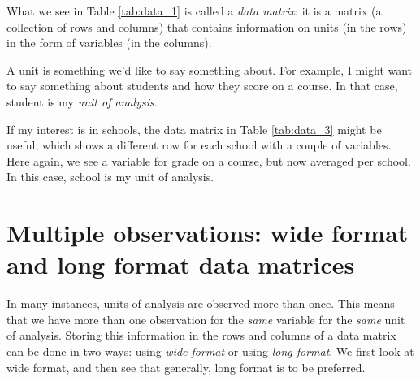What we see in Table \ref{tab:data_1} is called a \textit{data matrix}: it is a matrix (a collection of rows and columns) that contains information on units (in the rows) in the form of variables (in the columns).

A unit is something we'd like to say something about. For example, I might want to say something about students and how they score on a course. In that case, student is my \textit{unit of analysis}. 

% 

If my interest is in schools, the data matrix in Table \ref{tab:data_3} might be useful, which shows a different row for each school with a couple of variables. Here again, we see a variable for grade on a course, but now averaged per school. In this case, school is my unit of analysis. 

\begin{kframe}


{\ttfamily\noindent\bfseries{}}

{\ttfamily\noindent\bfseries{}}\end{kframe}


\section{Multiple observations: wide format and long format data matrices}

In many instances, units of analysis are observed more than once. This means that we have more than one observation for the \textit{same} variable for the \textit{same} unit of analysis. Storing this information in the rows and columns of a data matrix can be done in two ways: using \textit{wide format} or using \textit{long format}. We first look at wide format, and then see that generally, long format is to be preferred.

